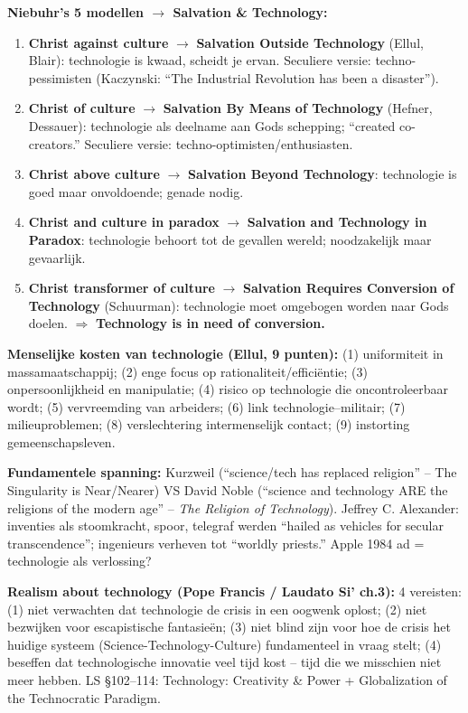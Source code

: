 \documentclass[a4paper,10pt]{article}
\begin{document}
\textbf{Niebuhr's 5 modellen $\to$ Salvation \& Technology:}
\begin{enumerate}[noitemsep]
  \item \textbf{Christ against culture} $\to$ \textbf{Salvation Outside Technology} (Ellul, Blair): technologie is kwaad, scheidt je ervan. Seculiere versie: techno-pessimisten (Kaczynski: ``The Industrial Revolution has been a disaster'').
  \item \textbf{Christ of culture} $\to$ \textbf{Salvation By Means of Technology} (Hefner, Dessauer): technologie als deelname aan Gods schepping; ``created co-creators.'' Seculiere versie: techno-optimisten/enthusiasten.
  \item \textbf{Christ above culture} $\to$ \textbf{Salvation Beyond Technology}: technologie is goed maar onvoldoende; genade nodig.
  \item \textbf{Christ and culture in paradox} $\to$ \textbf{Salvation and Technology in Paradox}: technologie behoort tot de gevallen wereld; noodzakelijk maar gevaarlijk.
  \item \textbf{Christ transformer of culture} $\to$ \textbf{Salvation Requires Conversion of Technology} (Schuurman): technologie moet omgebogen worden naar Gods doelen. $\Rightarrow$ \textbf{Technology is in need of conversion.}
\end{enumerate}

\textbf{Menselijke kosten van technologie (Ellul, 9 punten):} (1) uniformiteit in massamaatschappij; (2) enge focus op rationaliteit/efficiëntie; (3) onpersoonlijkheid en manipulatie; (4) risico op technologie die oncontroleerbaar wordt; (5) vervreemding van arbeiders; (6) link technologie--militair; (7) milieuproblemen; (8) verslechtering intermenselijk contact; (9) instorting gemeenschapsleven.

\textbf{Fundamentele spanning:} Kurzweil (``science/tech has replaced religion'' -- The Singularity is Near/Nearer) VS David Noble (``science and technology ARE the religions of the modern age'' -- \textit{The Religion of Technology}). Jeffrey C. Alexander: inventies als stoomkracht, spoor, telegraf werden ``hailed as vehicles for secular transcendence''; ingenieurs verheven tot ``worldly priests.'' Apple 1984 ad = technologie als verlossing?

\textbf{Realism about technology (Pope Francis / Laudato Si' ch.3):} 4 vereisten: (1) niet verwachten dat technologie de crisis in een oogwenk oplost; (2) niet bezwijken voor escapistische fantasieën; (3) niet blind zijn voor hoe de crisis het huidige systeem (Science-Technology-Culture) fundamenteel in vraag stelt; (4) beseffen dat technologische innovatie veel tijd kost -- tijd die we misschien niet meer hebben. LS §102--114: Technology: Creativity \& Power + Globalization of the Technocratic Paradigm.
\end{document}
